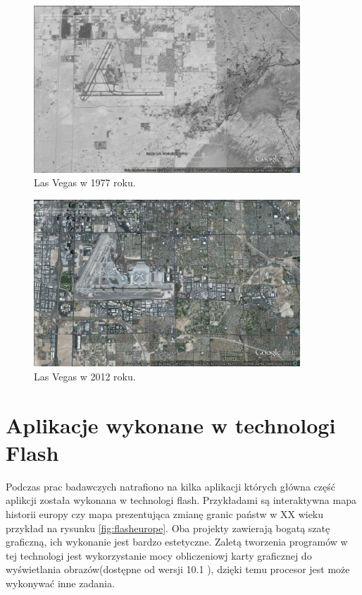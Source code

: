 \begin{figure}[H]
  \centering
    \includegraphics[width=100mm]{ge/02_1977.jpg}
  \caption{Las Vegas w 1977 roku.}
  \label{fig:lasVegas2}
\end{figure}

\begin{figure}[H]
  \centering
    \includegraphics[width=100mm]{ge/03_2012.jpg}
  \caption{Las Vegas w 2012 roku.}
  \label{fig:lasVegas3}
\end{figure}

\section{Aplikacje wykonane w technologi Flash}
\label{sec:flashmap}

Podczas prac badawczych natrafiono na kilka aplikacji których główna część aplikcji została wykonana w technologi flash. Przykładami są interaktywna mapa historii europy \cite{worldology} czy mapa prezentująca zmianę granic państw w XX wieku \cite{flashborder} przykład na rysunku \ref{fig:flasheurope}. Oba projekty zawierają bogatą szatę graficzną, ich wykonanie jest bardzo estetyczne.
Zaletą tworzenia programów w tej technologi jest wykorzystanie mocy obliczeniowj karty graficznej do wyświetlania obrazów(dostępne od wersji 10.1 \cite{flashfrapghic}), dzięki temu procesor jest może wykonywać inne zadania.

